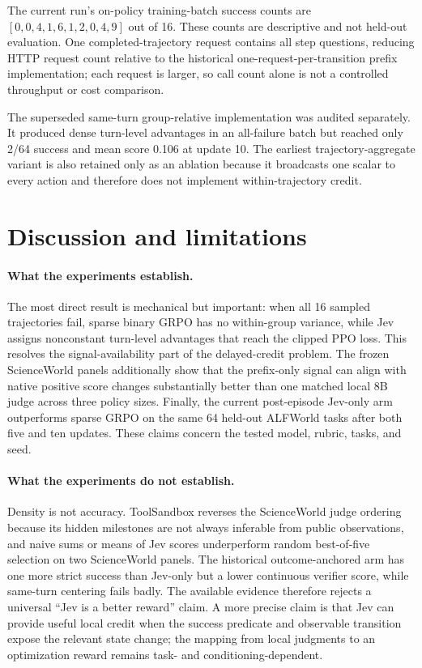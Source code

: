 \documentclass{article}
\begin{document}
The current run's on-policy training-batch success counts are $[0,0,4,1,6,1,2,0,4,9]$ out of 16. These counts are descriptive and not held-out evaluation. One completed-trajectory request contains all step questions, reducing HTTP request count relative to the historical one-request-per-transition prefix implementation; each request is larger, so call count alone is not a controlled throughput or cost comparison.

The superseded same-turn group-relative implementation was audited separately. It produced dense turn-level advantages in an all-failure batch but reached only 2/64 success and mean score 0.106 at update 10. The earliest trajectory-aggregate variant is also retained only as an ablation because it broadcasts one scalar to every action and therefore does not implement within-trajectory credit.

\section{Discussion and limitations}

\paragraph{What the experiments establish.}
The most direct result is mechanical but important: when all 16 sampled trajectories fail, sparse binary GRPO has no within-group variance, while Jev assigns nonconstant turn-level advantages that reach the clipped PPO loss. This resolves the signal-availability part of the delayed-credit problem. The frozen ScienceWorld panels additionally show that the prefix-only signal can align with native positive score changes substantially better than one matched local 8B judge across three policy sizes. Finally, the current post-episode Jev-only arm outperforms sparse GRPO on the same 64 held-out ALFWorld tasks after both five and ten updates. These claims concern the tested model, rubric, tasks, and seed.

\paragraph{What the experiments do not establish.}
Density is not accuracy. ToolSandbox reverses the ScienceWorld judge ordering because its hidden milestones are not always inferable from public observations, and naive sums or means of Jev scores underperform random best-of-five selection on two ScienceWorld panels. The historical outcome-anchored arm has one more strict success than Jev-only but a lower continuous verifier score, while same-turn centering fails badly. The available evidence therefore rejects a universal ``Jev is a better reward'' claim. A more precise claim is that Jev can provide useful local credit when the success predicate and observable transition expose the relevant state change; the mapping from local judgments to an optimization reward remains task- and conditioning-dependent.
\end{document}
